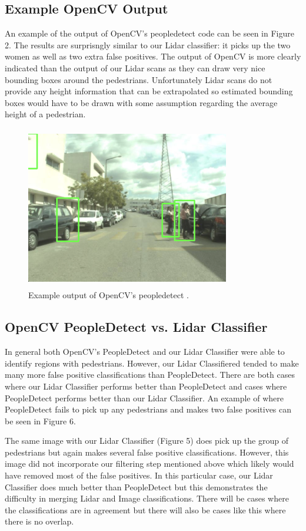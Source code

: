 \documentclass[10pt,twocolumn,letterpaper]{article}
\begin{document}
  \subsection{Example OpenCV Output}
  An example of the output of OpenCV's peopledetect \cite{opencv} code can be seen in Figure 2.
  The results are surprisngly similar to our Lidar classifier: it picks up the two
  women as well as two extra false positives. The output of OpenCV is more clearly
  indicated than the output of our Lidar scans as they can draw very nice bounding
  boxes around the pedestrians. Unfortunately Lidar scans do not provide any height
  information that can be extrapolated so estimated bounding boxes would have to be
  drawn with some assumption regarding the average height of a pedestrian.

  \begin{figure}
    \includegraphics[height=2.8in, width=3.5in]{images/peopledetect.png}
    \caption{ Example output of OpenCV's peopledetect \cite{opencv}. }
  \end{figure}


  \subsection{OpenCV PeopleDetect vs. Lidar Classifier}
  In general both OpenCV's PeopleDetect \cite{opencv} and our Lidar Classifier were
  able to identify regions with pedestrians. However, our Lidar Classifiered tended to
  make many more false positive classifications than PeopleDetect. There are both
  cases where our Lidar Classifier performs better than PeopleDetect and cases where
  PeopleDetect performs better than our Lidar Classifier. An example of where PeopleDetect
  fails to pick up any pedestrians and makes two false positives can be seen in Figure 6.

  The same image with our Lidar Classifier (Figure 5) does pick up the group of pedestrians but again
  makes several false positive classifications. However, this image did not incorporate our
  filtering step mentioned above which likely would have removed most of the false positives.
  In this particular case, our Lidar Classifier does much better than PeopleDetect but this
  demonstrates the difficulty in merging Lidar and Image classifications. There will be cases
  where the classifications are in agreement but there will also be cases like this where there
  is no overlap.
\end{document}
